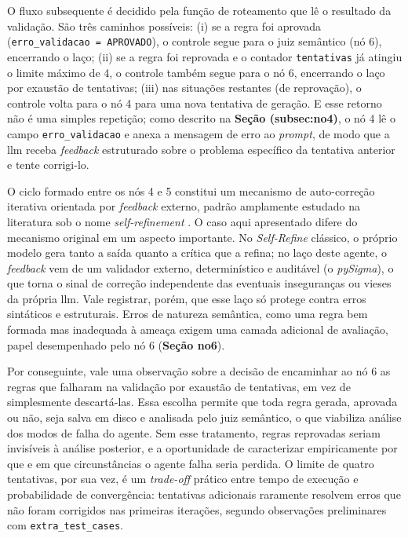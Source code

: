 O fluxo subsequente é decidido pela função de roteamento que lê o resultado da validação. 
São três caminhos possíveis: (i) se a regra foi aprovada (\texttt{erro\_validacao = APROVADO}), o controle segue para o juiz semântico (nó 6), encerrando o laço; 
(ii) se a regra foi reprovada e o contador \texttt{tentativas} já atingiu o limite máximo de 4, o controle também segue para o nó 6, encerrando o laço por exaustão de tentativas; (iii) nas situações restantes (de reprovação), o controle volta para o nó 4 para uma nova tentativa de geração. 
E esse retorno não é uma simples repetição; como descrito na \textbf{Seção (subsec:no4)}, o nó 4 lê o campo \texttt{erro\_validacao} e anexa a mensagem de erro ao \textit{prompt}, de modo que a \gls{llm} receba \textit{feedback} estruturado sobre o problema específico da tentativa anterior e tente corrigi-lo.

O ciclo formado entre os nós 4 e 5 constitui um mecanismo de auto-correção iterativa orientada por \textit{feedback} externo, padrão amplamente estudado na literatura sob o nome \textit{self-refinement} \cite{madaan2023selfrefine}. 
O caso aqui apresentado difere do mecanismo original em um aspecto importante. 
No \textit{Self-Refine} clássico, o próprio modelo gera tanto a saída quanto a crítica que a refina; no laço deste agente, o \textit{feedback} vem de um validador externo, determinístico e auditável (o \textit{pySigma}), o que torna o sinal de correção independente das eventuais inseguranças ou vieses da própria \gls{llm}. 
Vale registrar, porém, que esse laço só protege contra erros sintáticos e estruturais. 
Erros de natureza semântica, como uma regra bem formada mas inadequada à ameaça exigem uma camada adicional de avaliação, papel desempenhado pelo nó 6 (\textbf{Seção no6}).

Por conseguinte, vale uma observação sobre a decisão de encaminhar ao nó 6 as regras que falharam na validação por exaustão de tentativas, em vez de simplesmente descartá-las. 
Essa escolha permite que toda regra gerada, aprovada ou não, seja salva em disco e analisada pelo juiz semântico, o que viabiliza análise dos modos de falha do agente.
Sem esse tratamento, regras reprovadas seriam invisíveis à análise posterior, e a oportunidade de caracterizar empiricamente por que e em que circunstâncias o agente falha seria perdida. 
O limite de quatro tentativas, por sua vez, é um \textit{trade-off} prático entre tempo de execução e probabilidade de convergência: tentativas adicionais raramente resolvem erros que não foram corrigidos nas primeiras iterações, segundo observações preliminares com \texttt{extra\_test\_cases}.


